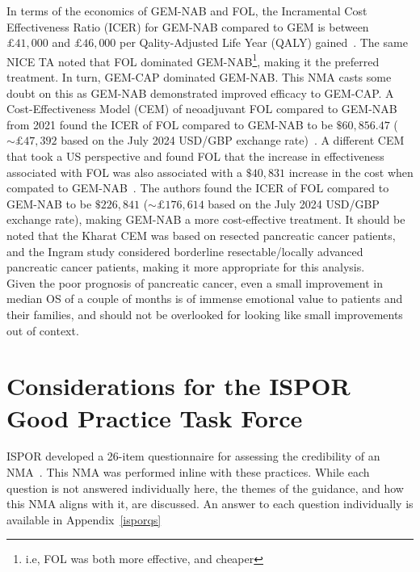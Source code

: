 In terms of the economics of GEM-NAB and FOL, the Incramental Cost Effectiveness Ratio (ICER) for GEM-NAB compared to GEM is between $£41,000$ and $£46,000$ per Qality-Adjusted Life Year (QALY) gained~\cite{TA476}. The same NICE TA noted that FOL dominated GEM-NAB\footnote{i.e, FOL was both more effective, and cheaper}, making it the preferred treatment. In turn, GEM-CAP dominated GEM-NAB. This NMA casts some doubt on this as GEM-NAB demonstrated improved efficacy to GEM-CAP. A Cost-Effectiveness Model (CEM) of neoadjuvant FOL compared to GEM-NAB from 2021 found the ICER of FOL compared to GEM-NAB to be $\$60,856.47$ ($\sim £47,392$ based on the July 2024 USD/GBP exchange rate)~\cite{ingram}. A different CEM that took a US perspective and found FOL that the increase in effectiveness associated with FOL was also associated with a $\$40,831$ increase in the cost when compated to GEM-NAB~\cite{kharat}. The authors found the ICER of FOL compared to GEM-NAB to be $\$226,841$ ($\sim £176,614$ based on the July 2024 USD/GBP exchange rate), making GEM-NAB a more cost-effective treatment. It should be noted that the Kharat CEM was based on resected pancreatic cancer patients, and the Ingram study considered borderline resectable/locally advanced pancreatic cancer patients, making it more appropriate for this analysis. \\

Given the poor prognosis of pancreatic cancer, even a small improvement in median OS of a couple of months is of immense emotional value to patients and their families, and should not be overlooked for looking like small improvements out of context.

\section{Considerations for the ISPOR Good Practice Task Force}
ISPOR developed a 26-item questionnaire for assessing the credibility of an NMA~\cite{jansengp}. This NMA was performed inline with these practices. While each question is not answered individually here, the themes of the guidance, and how this NMA aligns with it, are discussed. An answer to each question individually is available in Appendix~\ref{isporqs}\\

